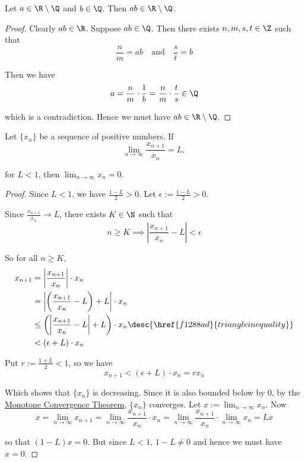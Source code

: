 \label{d9d3f10}

Let $a\in\R\setminus\Q$ and $b\in\Q$. Then $ab\in\R\setminus\Q$.

\begin{proof}
  Clearly $ab\in\R$. Suppose $ab\in\Q$. Then there exists $n,m,s,t\in\Z$ such
  that
  $$
    \frac nm=ab\quad\text{and}\quad \frac st=b
  $$

  Then we have
  $$
    a=\frac nm\cdot\frac1b=\frac nm\cdot\frac ts\in\Q
  $$

  which is a contradiction. Hence we must have $ab\in\R\setminus\Q$.
\end{proof}

\Result{}\label{a0b7c88}

Let $\{x_n\}$ be a sequence of positive numbers. If
$$
  \lim_{n\to\infty}\frac{x_{n+1}}{x_n}=L,
$$

for $L<1$, then $\displaystyle\lim_{n\to\infty}x_n=0$.

\begin{proof}
  Since $L<1$, we have $\frac{1-L}2>0$. Let $\epsilon:=\frac{1-L}2>0$.

  Since $\frac{x_{n+1}}{x_n}\to L$, there exists $K\in\N$ such that
  $$
    n\geq K\implies\left|\frac{x_{n+1}}{x_n}-L\right|<\epsilon
  $$

  So for all $n\geq K$,
  \begin{align*}
    x_{n+1}
     &=\left|\frac{x_{n+1}}{x_n}\right|\cdot x_n                                                               \\
     &=\left|\left(\frac{x_{n+1}}{x_n}-L\right)+L\right|\cdot x_n                                              \\
     &\leq\left(\left|\frac{x_{n+1}}{x_n}-L\right|+L\right)\cdot x_n\desc{\href{f1288ad}{triangle inequality}} \\
     &<(\epsilon + L)\cdot x_n
  \end{align*}

  Put $r:=\frac{1+L}2<1$, so we have
  $$
    x_{n+1}<(\epsilon+L)\cdot x_n=rx_n
  $$

  Which shows that $\{x_n\}$ is decreasing. Since it is also bounded below by
  0, by the \href{cc11aa4}{Monotone Convergence Theorem}, $\{x_n\}$ converges.
  Let $x:=\displaystyle\lim_{n\to\infty}x_n$. Now
  $$
    x=\lim_{n\to\infty}x_{n+1}
    =\lim_{n\to\infty}\frac{x_{n+1}}{x_n}\cdot x_n
    =\lim_{n\to\infty}\frac{x_{n+1}}{x_n}\cdot\lim_{n\to\infty}x_n
    =Lx
  $$

  so that $(1-L)x=0$. But since $L<1$, $1-L\neq0$ and hence we must have $x=0$.
\end{proof}

